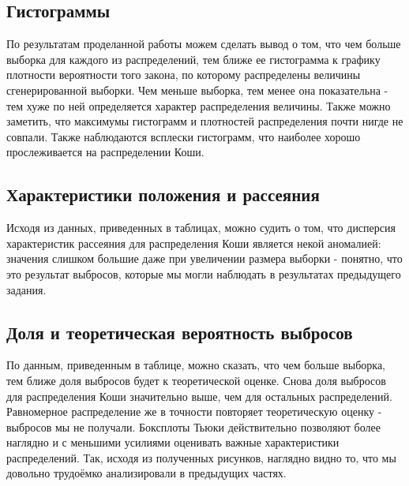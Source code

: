 \documentclass{article}
\begin{document}
\subsection{Гистограммы}
По результатам проделанной работы можем сделать вывод о том, что чем
больше выборка для каждого из распределений, тем ближе ее гистограмма
к графику плотности вероятности того закона, по которому распределены
величины сгенерированной выборки. Чем меньше выборка, тем менее она
показательна - тем хуже по ней определяется характер распределения величины.
Также можно заметить, что максимумы гистограмм и плотностей распределения почти нигде не совпали. Также наблюдаются всплески гистограмм,
что наиболее хорошо прослеживается на распределении Коши.

\subsection{Характеристики положения и рассеяния}
Исходя из данных, приведенных в таблицах, можно судить о том, что дисперсия характеристик рассеяния для распределения Коши является некой
аномалией: значения слишком большие даже при увеличении размера выборки - понятно, что это результат выбросов, которые мы могли наблюдать
в результатах предыдущего задания.

\subsection{Доля и теоретическая вероятность выбросов}
По данным, приведенным в таблице, можно сказать, что чем больше выборка, тем ближе доля выбросов будет к теоретической оценке. Снова доля
выбросов для распределения Коши значительно выше, чем для остальных
распределений. Равномерное распределение же в точности повторяет теоретическую оценку - выбросов мы не получали.
Боксплоты Тьюки действительно позволяют более наглядно и с меньшими
усилиями оценивать важные характеристики распределений. Так, исходя
из полученных рисунков, наглядно видно то, что мы довольно трудоёмко
анализировали в предыдущих частях.
\end{document}
